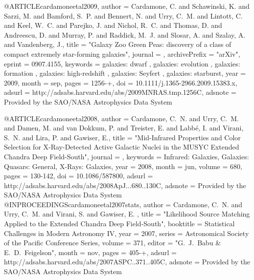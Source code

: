 {{{{{{{{{{{{{ 
@ARTICLE{cardamoneetal2009,
   author = {{Cardamone}, C. and {Schawinski}, K. and {Sarzi}, M. and {Bamford}, S.~P. and 
	{Bennert}, N. and {Urry}, C.~M. and {Lintott}, C. and {Keel}, W.~C. and 
	{Parejko}, J. and {Nichol}, R.~C. and {Thomas}, D. and {Andreescu}, D. and 
	{Murray}, P. and {Raddick}, M.~J. and {Slosar}, A. and {Szalay}, A. and 
	{Vandenberg}, J.},
    title = "{Galaxy Zoo Green Peas: discovery of a class of compact extremely star-forming galaxies}",
  journal = {\mnras},
archivePrefix = "arXiv",
   eprint = {0907.4155},
 keywords = {galaxies: dwarf , galaxies: evolution , galaxies: formation , galaxies: high-redshift , galaxies: Seyfert , galaxies: starburst},
     year = 2009,
    month = sep,
    pages = {1256-+},
      doi = {10.1111/j.1365-2966.2009.15383.x},
   adsurl = {http://adsabs.harvard.edu/abs/2009MNRAS.tmp.1256C},
  adsnote = {Provided by the SAO/NASA Astrophysics Data System}
}


@ARTICLE{cardamoneetal2008,
   author = {{Cardamone}, C.~N. and {Urry}, C.~M. and {Damen}, M. and {van Dokkum}, P. and 
	{Treister}, E. and {Labb{\'e}}, I. and {Virani}, S.~N. and {Lira}, P. and 
	{Gawiser}, E.},
    title = "{Mid-Infrared Properties and Color Selection for X-Ray-Detected Active Galactic Nuclei in the MUSYC Extended Chandra Deep Field-South}",
  journal = {\apj},
 keywords = {Infrared: Galaxies, Galaxies: Quasars: General, X-Rays: Galaxies},
     year = 2008,
    month = jun,
   volume = 680,
    pages = {130-142},
      doi = {10.1086/587800},
   adsurl = {http://adsabs.harvard.edu/abs/2008ApJ...680..130C},
  adsnote = {Provided by the SAO/NASA Astrophysics Data System}
}
@INPROCEEDINGS{cardamoneetal2007stats,
   author = {{Cardamone}, C.~N. and {Urry}, C.~M. and {Virani}, S. and {Gawiser}, E.
	},
    title = "{Likelihood Source Matching Applied to the Extended Chandra Deep Field-South}",
booktitle = {Statistical Challenges in Modern Astronomy IV},
     year = 2007,
   series = {Astronomical Society of the Pacific Conference Series},
   volume = 371,
   editor = "{G.~J.~Babu \& E.~D.~Feigelson}",
    month = nov,
    pages = {405-+},
   adsurl = {http://adsabs.harvard.edu/abs/2007ASPC..371..405C},
  adsnote = {Provided by the SAO/NASA Astrophysics Data System}
}


}}}}}}}}}}}}}
